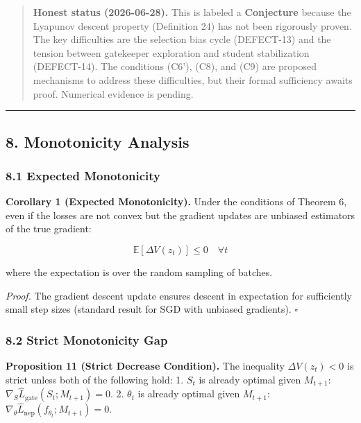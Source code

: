 \documentclass[
  12pt,
]{ctexart}
\begin{document}
\begin{quote}
\textbf{Honest status (2026-06-28).} This is labeled a
\textbf{Conjecture} because the Lyapunov descent property (Definition
24) has not been rigorously proven. The key difficulties are the
selection bias cycle (DEFECT-13) and the tension between gatekeeper
exploration and student stabilization (DEFECT-14). The conditions (C6'),
(C8), and (C9) are proposed mechanisms to address these difficulties,
but their formal sufficiency awaits proof. Numerical evidence is
pending.
\end{quote}

\begin{center}\rule{0.5\linewidth}{0.5pt}\end{center}

\subsection{8. Monotonicity Analysis}\label{monotonicity-analysis}

\subsubsection{8.1 Expected Monotonicity}\label{expected-monotonicity}

\textbf{Corollary 1 (Expected Monotonicity).} Under the conditions of
Theorem 6, even if the losses are not convex but the gradient updates
are unbiased estimators of the true gradient:

\[\mathbb{E}[\Delta V(z_t)] \leq 0 \quad \forall t\]

where the expectation is over the random sampling of batches.

\emph{Proof.} The gradient descent update ensures descent in expectation
for sufficiently small step sizes (standard result for SGD with unbiased
gradients). \(\square\)

\subsubsection{8.2 Strict Monotonicity
Gap}\label{strict-monotonicity-gap}

\textbf{Proposition 11 (Strict Decrease Condition).} The inequality
\(\Delta V(z_t) < 0\) is strict unless both of the following hold: 1.
\(S_t\) is already optimal given \(M_{t+1}\):
\(\nabla_S \hat{L}_{\text{gate}}(S_t; M_{t+1}) = 0\). 2. \(\theta_t\) is
already optimal given \(M_{t+1}\):
\(\nabla_\theta \hat{L}_{\text{nep}}(f_{\theta_t}; M_{t+1}) = 0\).
\end{document}
